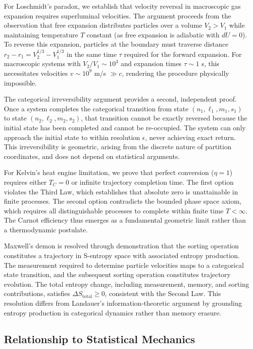 For Loschmidt's paradox, we establish that velocity reversal in macroscopic gas expansion requires superluminal velocities. The argument proceeds from the observation that free expansion distributes particles over a volume $V_2 > V_1$ while maintaining temperature $T$ constant (as free expansion is adiabatic with $dU = 0$). To reverse this expansion, particles at the boundary must traverse distance $r_2 - r_1 = V_2^{1/3} - V_1^{1/3}$ in the same time $\tau$ required for the forward expansion. For macroscopic systems with $V_2/V_1 \sim 10^3$ and expansion times $\tau \sim 1$ s, this necessitates velocities $v \sim 10^9$ m/s $\gg c$, rendering the procedure physically impossible.

The categorical irreversibility argument provides a second, independent proof. Once a system completes the categorical transition from state $(n_1,\ell_1,m_1,s_1)$ to state $(n_2,\ell_2,m_2,s_2)$, that transition cannot be exactly reversed because the initial state has been completed and cannot be re-occupied. The system can only approach the initial state to within resolution $\epsilon$, never achieving exact return. This irreversibility is geometric, arising from the discrete nature of partition coordinates, and does not depend on statistical arguments.

For Kelvin's heat engine limitation, we prove that perfect conversion ($\eta = 1$) requires either $T_C = 0$ or infinite trajectory completion time. The first option violates the Third Law, which establishes that absolute zero is unattainable in finite processes. The second option contradicts the bounded phase space axiom, which requires all distinguishable processes to complete within finite time $T < \infty$. The Carnot efficiency thus emerges as a fundamental geometric limit rather than a thermodynamic postulate.

Maxwell's demon is resolved through demonstration that the sorting operation constitutes a trajectory in S-entropy space with associated entropy production. The measurement required to determine particle velocities maps to a categorical state transition, and the subsequent sorting operation constitutes trajectory evolution. The total entropy change, including measurement, memory, and sorting contributions, satisfies $\Delta S_{\text{total}} \geq 0$, consistent with the Second Law. This resolution differs from Landauer's information-theoretic argument \citep{landauer1961} by grounding entropy production in categorical dynamics rather than memory erasure.

\subsection{Relationship to Statistical Mechanics}

